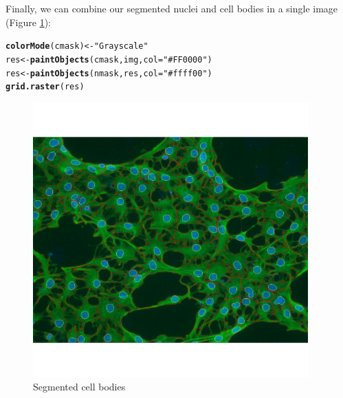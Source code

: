 \documentclass{article}\usepackage[]{graphicx}\usepackage[]{color}
\makeatletter
\newcommand{\hlstr}[1]{\textcolor[rgb]{0.192,0.494,0.8}{#1}}%
\newcommand{\hlstd}[1]{\textcolor[rgb]{0.345,0.345,0.345}{#1}}%
\newcommand{\hlkwb}[1]{\textcolor[rgb]{0.69,0.353,0.396}{#1}}%
\newcommand{\hlkwc}[1]{\textcolor[rgb]{0.333,0.667,0.333}{#1}}%
\newcommand{\hlkwd}[1]{\textcolor[rgb]{0.737,0.353,0.396}{\textbf{#1}}}%
\newenvironment{kframe}{%
 \def\at@end@of@kframe{}%
 \ifinner\ifhmode%
  \def\at@end@of@kframe{\end{minipage}}%
  \begin{minipage}{\columnwidth}%
 \fi\fi%
 \def\FrameCommand##1{\hskip\@totalleftmargin \hskip-\fboxsep
 \colorbox{shadecolor}{##1}\hskip-\fboxsep
     \hskip-\linewidth \hskip-\@totalleftmargin \hskip\columnwidth}%
 \MakeFramed {\advance\hsize-\width
   \@totalleftmargin\z@ \linewidth\hsize
   \@setminipage}}%
 {\par\unskip\endMakeFramed%
 \at@end@of@kframe}
\newenvironment{knitrout}{}{} %
\makeatother
\begin{document}
Finally, we can combine our segmented nuclei and cell bodies in a single image (Figure \ref{fig:res}):
\begin{knitrout}
\color{fgcolor}\begin{kframe}
\begin{alltt}
\hlkwd{colorMode}\hlstd{(cmask)} \hlkwb{<-} \hlstr{"Grayscale"}
\hlstd{res} \hlkwb{<-} \hlkwd{paintObjects}\hlstd{(cmask, img,} \hlkwc{col} \hlstd{=} \hlstr{"#FF0000"}\hlstd{)}
\hlstd{res} \hlkwb{<-} \hlkwd{paintObjects}\hlstd{(nmask, res,} \hlkwc{col} \hlstd{=} \hlstr{"#ffff00"}\hlstd{)}
\hlkwd{grid.raster}\hlstd{(res)}
\end{alltt}
\end{kframe}\begin{figure}[]


{\centering \includegraphics[width=400px]{knit_figure/figres} 

}

\caption[Segmented cell bodies]{Segmented cell bodies\label{fig:res}}
\end{figure}


\end{knitrout}
\end{document}
